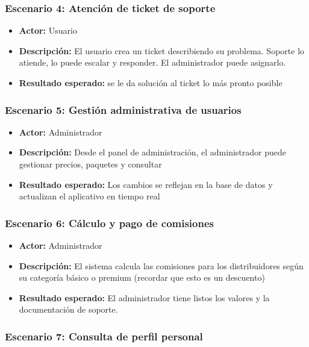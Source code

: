 \subsubsection{Escenario 4: Atención de ticket de soporte}

\begin{itemize}
\item \textbf{Actor:} Usuario
\item \textbf{Descripción:} El usuario crea un ticket describiendo su problema. Soporte lo atiende, lo puede escalar y responder. El administrador puede asignarlo.
\item \textbf{Resultado esperado:} se le da solución al ticket lo más pronto posible
\end{itemize}



\subsubsection{Escenario 5: Gestión administrativa de usuarios}

\begin{itemize}
\item \textbf{Actor:} Administrador
\item \textbf{Descripción:} Desde el panel de administración, el administrador puede gestionar precios, paquetes y consultar
\item \textbf{Resultado esperado:} Los cambios se reflejan en la base de datos y actualizan el aplicativo en tiempo real
\end{itemize}



\subsubsection{Escenario 6: Cálculo y pago de comisiones}

\begin{itemize}
\item \textbf{Actor:} Administrador
\item \textbf{Descripción:} El sistema calcula las comisiones para los distribuidores según su categoría básico o premium (recordar que esto es un descuento)
\item \textbf{Resultado esperado:} El administrador tiene listos los valores y la documentación de soporte.
\end{itemize}

\subsubsection{Escenario 7: Consulta de perfil personal}

